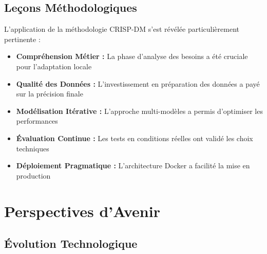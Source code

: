 \subsection{Leçons Méthodologiques}

L'application de la méthodologie CRISP-DM s'est révélée particulièrement pertinente :

\begin{itemize}
    \item \textbf{Compréhension Métier :} La phase d'analyse des besoins a été cruciale pour l'adaptation locale
    \item \textbf{Qualité des Données :} L'investissement en préparation des données a payé sur la précision finale
    \item \textbf{Modélisation Itérative :} L'approche multi-modèles a permis d'optimiser les performances
    \item \textbf{Évaluation Continue :} Les tests en conditions réelles ont validé les choix techniques
    \item \textbf{Déploiement Pragmatique :} L'architecture Docker a facilité la mise en production
\end{itemize}

\section{Perspectives d'Avenir}

\subsection{Évolution Technologique}

